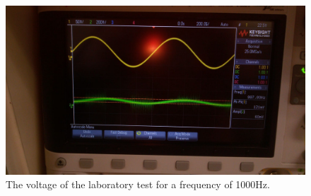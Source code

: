 \begin{figure}[h] 
\centering
\includegraphics[width=0.6\linewidth]{1000Hz.jpeg}
\caption{The voltage of the laboratory test for a frequency of 1000Hz.}
\label{Fig11: 1000Hz}
\end{figure}
